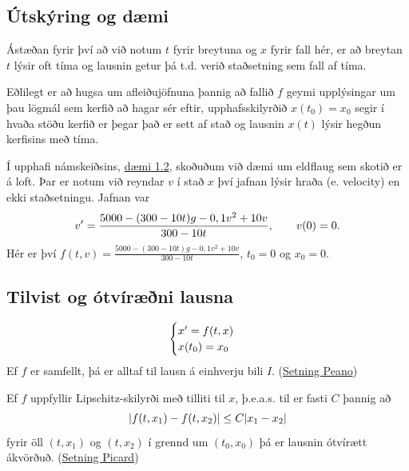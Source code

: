 \documentclass[letterpaper,10pt,icelandic]{sphinxmanual}
\begin{document}
\subsection{Útskýring og dæmi}
\label{kafli06:utskyring-og-daemi}
Ástæðan fyrir því að við notum \(t\) fyrir breytuna og \(x\) fyrir fall
hér, er að breytan \(t\) lýsir oft tíma og lausnin getur þá t.d. verið staðsetning
sem fall af tíma.

Eðlilegt er að hugsa um afleiðujöfnuna þannig að fallið \(f\) geymi upplýsingar
um þau lögmál sem kerfið að hagar sér eftir, upphafsskilyrðið \(x(t_0)=x_0\)
segir í hvaða stöðu kerfið er þegar það er sett af stað og
lausnin \(x(t)\) lýsir hegðun kerfisins með tíma.

Í upphafi námskeiðsins,
\href{https://notendur.hi.is/~bsm/stae405/kafli01.html\#daemi-eldflaug}{dæmi 1.2}, skoðuðum
við dæmi um eldflaug sem skotið er á loft. Þar er notum við reyndar \(v\) í stað
\(x\) því jafnan lýsir hraða (e. velocity) en ekki staðsetningu.
Jafnan var
\begin{gather}
\begin{split}v' = \frac{5000-(300-10t)g-0,1v^2+10v}{300-10t},   \qquad v(0)=0.\end{split}\notag
\end{gather}
Hér er því \(f(t,v) = \frac{5000-(300-10t)g-0,1v^2+10v}{300-10t}\), \(t_0=0\)
og \(x_0 = 0\).


\subsection{Tilvist og ótvíræðni lausna}
\label{kafli06:tilvist-og-otviraeni-lausna}\label{kafli06:index-2}\begin{gather}
\begin{split}\begin{cases}
x' = f(t,x)\\
x(t_0) = x_0
\end{cases}\end{split}\notag
\end{gather}
Ef \(f\) er samfellt, þá er alltaf til lausn á einhverju bili
\(I\). (\href{https://en.wikipedia.org/wiki/Peano\_existence\_theorem}{Setning Peano})

Ef \(f\) uppfyllir Lipschitz-skilyrði með tilliti til \(x\),
þ.e.a.s. til er fasti \(C\) þannig að
\begin{gather}
\begin{split}|f(t,x_1) - f(t,x_2)| \leq C|x_1 - x_2|\end{split}\notag
\end{gather}
fyrir öll \((t,x_1)\) og \((t,x_2)\) í grennd um
\((t_0, x_0)\) þá er lausnin ótvírætt ákvörðuð. (\href{https://en.wikipedia.org/wiki/Picard\%E2\%80\%93Lindel\%C3\%B6f\_theorem}{Setning Picard})
\end{document}
